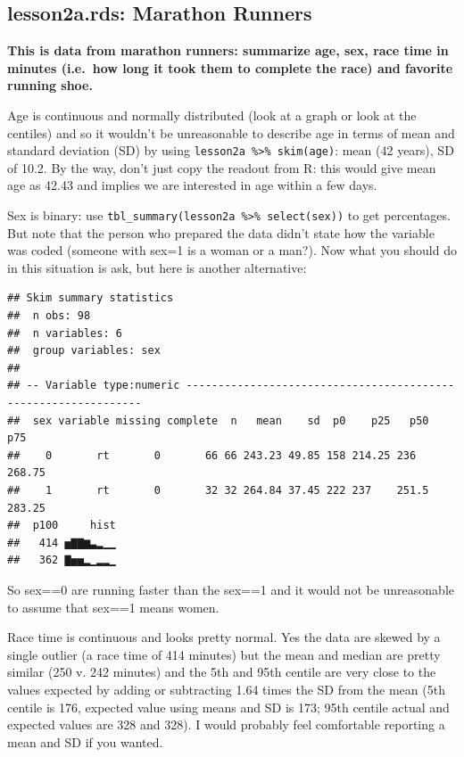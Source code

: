 \documentclass[]{book}
\newenvironment{Shaded}{\begin{snugshade}}{\end{snugshade}}
\newcommand{\KeywordTok}[1]{\textcolor[rgb]{0.13,0.29,0.53}{\textbf{#1}}}
\newcommand{\NormalTok}[1]{#1}
\newcommand{\OperatorTok}[1]{\textcolor[rgb]{0.81,0.36,0.00}{\textbf{#1}}}
\newcommand{\StringTok}[1]{\textcolor[rgb]{0.31,0.60,0.02}{#1}}
\begin{document}
\hypertarget{lesson2a.rds-marathon-runners}{%
\subsection{lesson2a.rds: Marathon Runners}\label{lesson2a.rds-marathon-runners}}

\textbf{This is data from marathon runners: summarize age, sex, race time in minutes (i.e.~how long it took them to complete the race) and favorite running shoe.}

Age is continuous and normally distributed (look at a graph or look at the centiles) and so it wouldn't be unreasonable to describe age in terms of mean and standard deviation (SD) by using \texttt{lesson2a\ \%\textgreater{}\%\ skim(age)}: mean (42 years), SD of 10.2. By the way, don't just copy the readout from R: this would give mean age as 42.43 and implies we are interested in age within a few days.

Sex is binary: use \texttt{tbl\_summary(lesson2a\ \%\textgreater{}\%\ select(sex))} to get percentages. But note that the person who prepared the data didn't state how the variable was coded (someone with sex=1 is a woman or a man?). Now what you should do in this situation is ask, but here is another alternative:

\begin{Shaded}
\end{Shaded}

\begin{verbatim}
## Skim summary statistics
##  n obs: 98 
##  n variables: 6 
##  group variables: sex 
## 
## -- Variable type:numeric ---------------------------------------------------------------
##  sex variable missing complete  n   mean    sd  p0    p25   p50    p75
##    0       rt       0       66 66 243.23 49.85 158 214.25 236   268.75
##    1       rt       0       32 32 264.84 37.45 222 237    251.5 283.25
##  p100     hist
##   414 ▅▇▇▆▃▂▁▁
##   362 ▇▅▅▂▁▂▂▁
\end{verbatim}

So sex==0 are running faster than the sex==1 and it would not be unreasonable to assume that sex==1 means women.

Race time is continuous and looks pretty normal. Yes the data are skewed by a single outlier (a race time of 414 minutes) but the mean and median are pretty similar (250 v. 242 minutes) and the 5th and 95th centile are very close to the values expected by adding or subtracting 1.64 times the SD from the mean (5th centile is 176, expected value using means and SD is 173; 95th centile actual and expected values are 328 and 328). I would probably feel comfortable reporting a mean and SD if you wanted.
\end{document}
